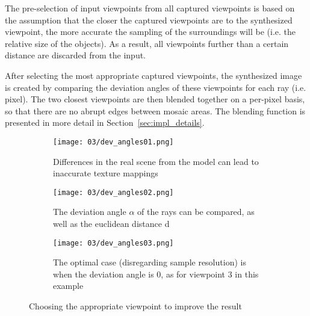 The pre-selection of input viewpoints from all captured viewpoints is based on the assumption that the closer the captured viewpoints are to the synthesized viewpoint, the more accurate the sampling of the surroundings will be (i.e. the relative size of the objects). As a result, all viewpoints further than a certain distance are discarded from the input. \label{misc:input_selection}

After selecting the most appropriate captured viewpoints, the synthesized image is created by comparing the deviation angles of these viewpoints for each ray (i.e. pixel). The two closest viewpoints are then blended together on a per-pixel basis, so that there are no abrupt edges between mosaic areas. The blending function is presented in more detail in Section~\ref{sec:impl_details}.

\begin{figure}
\centering
    \hfill
    \begin{subfigure}[t]{0.3\textwidth}            
            \centering
            \texttt{[image: 03/dev\_angles01.png]}
            \caption{Differences in the real scene from the model can lead to inaccurate texture mappings}
    \end{subfigure}%
    \hfill
    \begin{subfigure}[t]{0.3\textwidth}
            \centering
            \texttt{[image: 03/dev\_angles02.png]}
            \caption{The deviation angle $\alpha$ of the rays can be compared, as well as the euclidean distance d}
    \end{subfigure}
    \hfill
    \begin{subfigure}[t]{0.3\textwidth}
            \centering
            \texttt{[image: 03/dev\_angles03.png]}
            \caption{The optimal case (disregarding sample resolution) is when the deviation angle is 0, as for viewpoint 3 in this example}
    \end{subfigure}
    \hfill
    \caption[Choosing the appropriate viewpoint for texture lookup]{Choosing the appropriate viewpoint to improve the result} \label{fig:dev_angle}
\end{figure}

